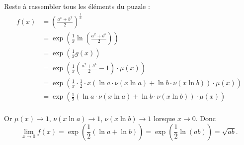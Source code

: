 {{Reste à rassembler tous les éléments du puzzle :
\begin{align*}
 f(x) &= \left(\frac{a^{x}+b^{x}}{2}\right)^{\frac{1}{x}} \\
      &= \exp\left( \frac 1x \ln \left(\frac{a^{x}+b^{x}}{2}\right) \right) \\
      &= \exp\left( \frac 1x g(x) \right) \\
      &= \exp\left( \frac 1x  \left(\frac{a^{x}+b^{x}}{2}-1\right) \cdot \mu(x) \right) \\
      &= \exp\left( \frac 1x  \cdot \frac12  \cdot x\left(\ln a \cdot \nu(x \ln a) +  \ln b \cdot \nu(x \ln b) \right) \cdot \mu(x) \right) \\
      &= \exp\left( \frac12 \left(\ln a \cdot \nu(x \ln a) +  \ln b \cdot \nu(x \ln b) \right) \cdot \mu(x) \right) \\
\end{align*}

Or $\mu(x) \to 1$, $\nu(x \ln a) \to 1$, $\nu(x \ln b) \to 1$ lorsque $x \to 0$.
Donc 
$$\lim_{x\to 0} f(x) = \exp\left( \frac12 \left(\ln a + \ln b \right) \right) = \exp\left( \frac12 \ln (ab) \right) = \sqrt{ab}.$$
}
}
